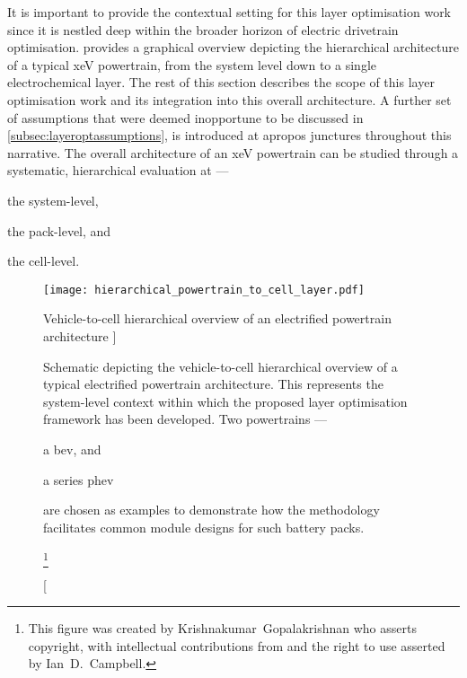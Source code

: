 

It is  important to provide the  contextual setting for this  layer optimisation
work since it is nestled deep  within the broader horizon of electric drivetrain
optimisation.   provides a  graphical overview
depicting the hierarchical architecture of  a typical \gls{xeV} powertrain, from
the  system level  down to  a  single electrochemical  layer. The  rest of  this
section describes the scope of this  layer optimisation work and its integration
into this  overall architecture. A further  set of assumptions that  were deemed
inopportune to be discussed  in \cref{subsec:layeroptassumptions}, is introduced
at apropos junctures  throughout this narrative. The overall  architecture of an
\gls{xeV}  powertrain  can  be  studied through  a  systematic,  hierarchical
evaluation at ---
\begin{enumerate*}[label=\itshape\alph*\upshape)]
    \item the system-level,
    \item the pack-level, and
    \item the cell-level.
\end{enumerate*}

\begin{figure}[!bp]
    \begin{minipage}[t]{\textwidth}
        \centering
        \texttt{[image: hierarchical\_powertrain\_to\_cell\_layer.pdf]}
        \captionsetup{labelsep=note}
        \caption
        [%
        Vehicle-to-cell hierarchical overview of an electrified powertrain architecture
        ]%
        {%
            Schematic depicting the vehicle-to-cell hierarchical overview of
            a typical electrified powertrain architecture. This represents the
            system-level context within which the proposed layer optimisation framework
            has been developed. Two  powertrains ---
            \begin{enumerate*}[label=\itshape\alph*\upshape)]
                \item a \gls{bev}, and
                \item a series \gls{phev}
            \end{enumerate*}
            are chosen as examples to demonstrate how the methodology facilitates
            common module designs for such battery packs.
        }%
        \label{fig:fig_PowertrainSchematic}
        \mpfootnotes[1]
        \footnote{This figure was created by \mbox{Krishnakumar Gopalakrishnan} who
            asserts copyright, with intellectual contributions from and the right to
        use asserted by \mbox{Ian D.\ Campbell}.}
    \end{minipage}
\end{figure}

